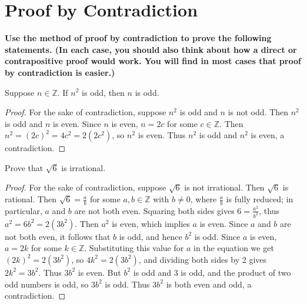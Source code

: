 \documentclass[DIN, pagenumber=false, fontsize=11pt, parskip=half]{scrartcl}
\title{}
\author{} %
\date{}
\begin{document}
\maketitle

\setcounter{section}{5}

\section{Proof by Contradiction}

\textbf{Use the method of proof by contradiction to prove the following statements. (In each case, you should also think about how a direct or contrapositive proof would work. You will find in most cases that proof by contradiction is easier.)}

\begin{problems}
    \problem Suppose $n \in \mathbb{Z}$. If $n^2$ is odd, then $n$ is odd.
    \begin{proof}
        For the sake of contradiction, suppose $n^2$ is odd and $n$ is not odd.
        Then $n^2$ is odd and $n$ is even.
        Since $n$ is even, $n = 2c$ for some $c \in \mathbb{Z}$.
        Then $n^2 = (2c)^2 = 4c^2 = 2(2c^2)$, so $n^2$ is even.
        Thus $n^2$ is odd and $n^2$ is even, a contradiction.
    \end{proof}

    \problem Prove that $\sqrt{6}$ is irrational.
    \begin{proof}
        For the sake of contradiction, suppose $\sqrt{6}$ is not irrational.
        Then $\sqrt{6}$ is rational.
        Then $\sqrt{6} = \frac{a}{b}$ for some $a,b \in \mathbb{Z}$ with $b \neq 0$, where $\frac{a}{b}$ is fully reduced; in particular, $a$ and $b$ are not both even.
        Squaring both sides gives $6 = \frac{a^2}{b^2}$, thus $a^2 = 6b^2 = 2(3b^2)$.
        Then $a^2$ is even, which implies $a$ is even.
        Since $a$ and $b$ are not both even, it follows that $b$ is odd, and hence $b^2$ is odd.
        Since $a$ is even, $a = 2k$ for some $k \in \mathbb{Z}$.
        Substituting this value for $a$ in the equation we get $(2k)^2 = 2(3b^2)$, so
        $4k^2 = 2(3b^2)$, and dividing both sides by 2 gives $2k^2 = 3b^2$.
        Thus $3b^2$ is even.
        But $b^2$ is odd and 3 is odd, and the product of two odd numbers is odd, so $3b^2$ is odd.
        Thus $3b^2$ is both even and odd, a contradiction.
    \end{proof}


\end{problems}
\end{document}
